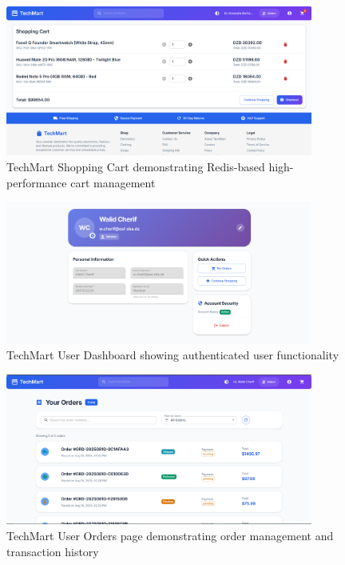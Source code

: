 \begin{figure}[H]
\centering
\includegraphics[width=0.9\textwidth]{figures/chapter5/techmart-shopping-cart.png}
\caption{TechMart Shopping Cart demonstrating Redis-based high-performance cart management}
\label{fig:techmart-shopping-cart}
\end{figure}

\begin{figure}[H]
\centering
\includegraphics[width=0.9\textwidth]{figures/chapter5/techmart-user-dashboard.png}
\caption{TechMart User Dashboard showing authenticated user functionality}
\label{fig:techmart-user-dashboard}
\end{figure}

\begin{figure}[H]
\centering
\includegraphics[width=0.9\textwidth]{figures/chapter5/techmart-user-orders.png}
\caption{TechMart User Orders page demonstrating order management and transaction history}
\label{fig:techmart-user-orders}
\end{figure}

